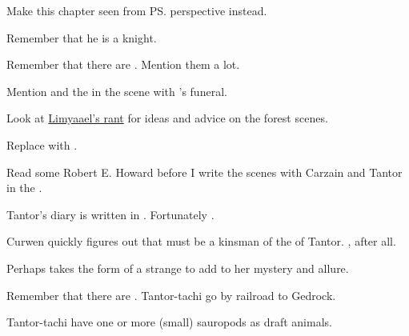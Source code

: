 \begin{changes}
  \begin{comment}
  \paragraph{For War and For Glory}
  \end{comment}
    Make this chapter seen from \ps{\Sethgal} perspective instead. 
    
    Remember that he is a knight. 
    
    Remember that there are . 
    Mention them a lot. 
  
  \begin{comment}\paragraph{Veils that Divide}\end{comment}
    Mention \Isphet and the \qliphoth in the scene with \Icor's funeral. 
  
  \begin{comment}\paragraph{The Mystery of \EreshKal}\end{comment}
    Look at \href{http://limyaael.livejournal.com/167123.html}{Limyaael's  rant} for ideas and advice on the forest scenes. 
    
    Replace  with . 
    
    Read some Robert E. Howard before I write the scenes with Carzain and Tantor in the \wylde. 
    
    Tantor's diary is written in .
    Fortunately .
    
    Curwen quickly figures out that  must be a kinsman of the \scarv{} of Tantor. 
    , after all.
    
    Perhaps \Takestsha takes the form of a strange  to add to her mystery and allure.
    
    Remember that there are . 
    Tantor-tachi go by railroad to Gedrock. 
    
    Tantor-tachi have one or more (small) sauropods as draft animals. 
    

\end{changes}
